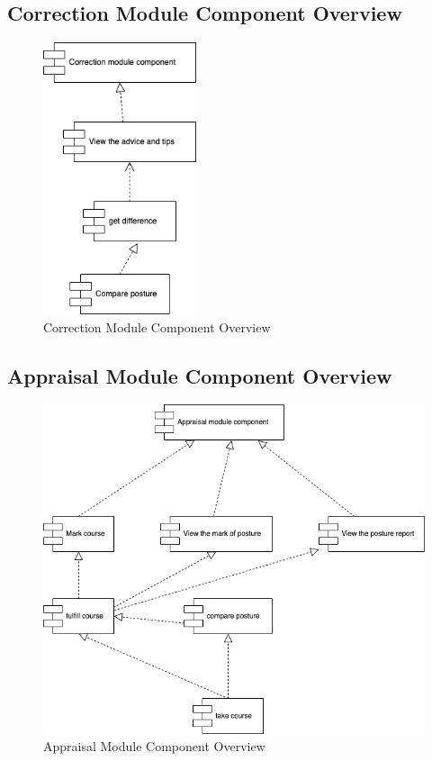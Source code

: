 \documentclass[16pt]{scrreprt}
\begin{document}
\subsection{Correction Module Component Overview}
\begin{figure}[H]
    \centering
    \includegraphics[width=0.4\textwidth]{diagrams/correction.png}
    \caption{Correction Module Component Overview}
\end{figure}

\subsection{Appraisal Module Component Overview}
\begin{figure}[H]
    \centering
    \includegraphics[width=1\textwidth]{diagrams/appraisal.png}
    \caption{Appraisal Module Component Overview}
\end{figure}
\end{document}
